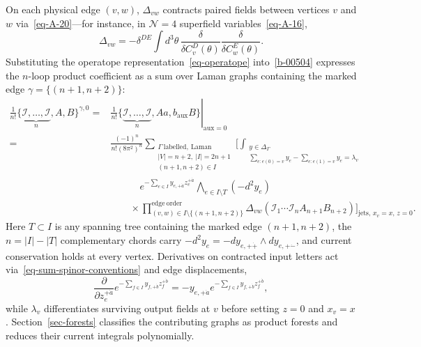 \documentclass[11pt]{article}
\numberwithin{equation}{section}
\numberwithin{figure}{section}
\numberwithin{table}{section}
\begin{document}
On each physical edge $(v,w)$, $\Delta_{vw}$ contracts paired fields between vertices $v$ and $w$ via~\eqref{eq-A-20}---for instance, in $\mathcal N=4$ superfield variables~\eqref{eq-A-16},
\begin{equation*}
\Delta_{vw}=-\delta^{DE}\int d^3\theta\,
\frac{\delta}{\delta C_v^D(\theta)}
\frac{\delta}{\delta C_w^E(\theta)}.
\end{equation*}
Substituting the operatope representation~\eqref{eq-operatope} into~\eqref{b-00504} expresses the $n$-loop product coefficient as a sum over Laman graphs containing the marked edge $\gamma=\{(n+1,n+2)\}$:
\begin{equation}\label{eq-2-31}
\begin{aligned}
\frac1{n!}\bigl\{\underbrace{\mathcal I,\ldots,\mathcal I}_{n},A,B\bigr\}^{\gamma,0}
={}&\left.\frac1{n!}\bigl\{\underbrace{\mathcal I,\ldots,\mathcal I}_{n},Aa,b_{\mathrm{aux}}B\bigr\}\right|_{\mathrm{aux}=0}\\
={}&\frac{(-1)^n}{n!(8\pi^2)^n}
\sum_{\substack{\Gamma\ \mathrm{labelled,\ Laman}\\
|V|=n+2,\ |I|=2n+1\\(n+1,n+2)\in I}}
\Bigg[\int_{\substack{y\in\Delta_\Gamma\\
\sum_{e:e(0)=v}y_e-\sum_{e:e(1)=v}y_e=\lambda_v}}\\
&\qquad\quad e^{-\sum_{e\in I}y_{e,+\dot a}z_e^{+\dot a}}
\bigwedge_{e\in I\setminus T}(-d^2y_e)\\
&\qquad\times\prod_{(v,w)\in I\setminus\{(n+1,n+2)\}}^{\mathrm{edge\ order}}
\Delta_{vw}(\mathcal I_1\cdots\mathcal I_nA_{n+1}B_{n+2})
\Bigg]_{\mathrm{jets},\,x_v=x,\,z=0}.
\end{aligned}
\end{equation}
Here $T\subset I$ is any spanning tree containing the marked edge $(n+1,n+2)$, the $n=|I|-|T|$ complementary chords carry $-d^2y_e=-dy_{e,+\dot+}\wedge dy_{e,+\dot-}$, and current conservation holds at every vertex. Derivatives on contracted input letters act via~\eqref{eq-sum-spinor-conventions} and edge displacements,
\begin{equation}\label{eq-product-current-insertion}
\frac{\partial}{\partial z_e^{+\dot a}}
e^{-\sum_{f\in I}y_{f,+\dot b}z_f^{+\dot b}}
=-y_{e,+\dot a}
e^{-\sum_{f\in I}y_{f,+\dot b}z_f^{+\dot b}},
\end{equation}
while $\lambda_v$ differentiates surviving output fields at $v$ before setting $z=0$ and $x_v=x$. Section~\ref{sec-forests} classifies the contributing graphs as product forests and reduces their current integrals polynomially.
\end{document}
